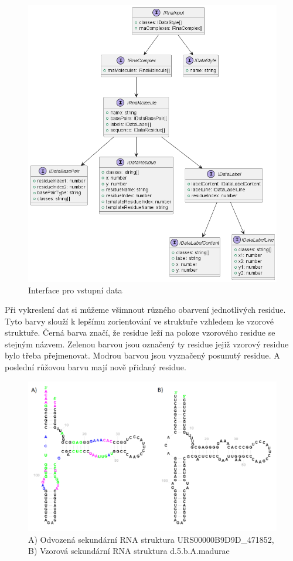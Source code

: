 \begin{figure}[H]
  \centering
  \includegraphics[width=145mm]{../img/kap03/rnaInput.png}
  \caption{Interface pro vstupní data}
\end{figure}

Při vykreslení dat si můžeme všimnout různého obarvení jednotlivých residue.
Tyto barvy slouží k lepšímu zorientování ve struktuře vzhledem ke vzorové
struktuře. Černá barva značí, že residue leží na poloze vzorového residue se
stejným názvem. Zelenou barvou jsou označený ty residue jejiž vzorový residue
bylo třeba přejmenovat. Modrou barvou jsou vyznačený posunutý residue. A poslední
růžovou barvu mají nově přidaný residue.

\begin{figure}[H]
  \centering
  \includegraphics[width=140mm]{../img/kap03/inputDataColors.png}
  \caption{A) Odvozená sekundární RNA struktura URS00000B9D9D\_471852, B)
  Vzorová sekundární RNA struktura d.5.b.A.madurae}
\end{figure}

